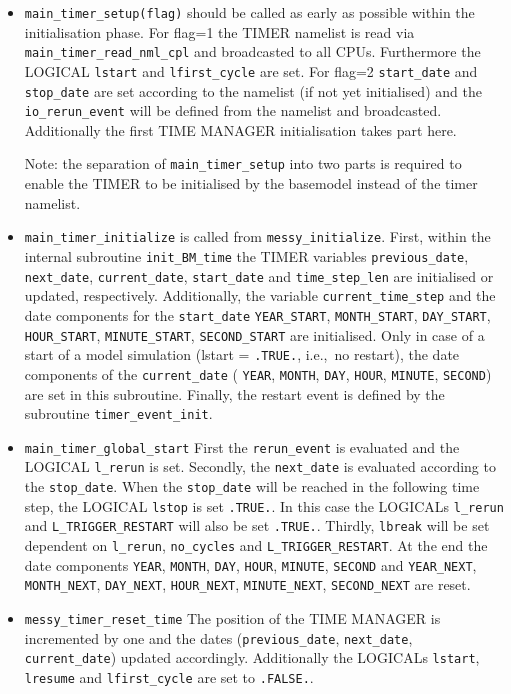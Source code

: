 \documentclass[twoside]{article}
\begin{document}
\begin{itemize}
\item \verb|main_timer_setup(flag)| should be called as early as possible within 
 the initialisation phase. For flag=1 the TIMER namelist is
 read via \verb|main_timer_read_nml_cpl| and broadcasted to all CPUs. 
 Furthermore the {\footnotesize LOGICAL} \verb|lstart| and \verb|lfirst_cycle| are set.
 For flag=2  \verb|start_date| and \verb|stop_date| are set according to the
 namelist (if not yet initialised) and the \verb|io_rerun_event| will be
 defined from the namelist and broadcasted. Additionally the first TIME MANAGER
 initialisation takes part here.
 
 Note: the separation of \verb|main_timer_setup| into two
 parts is required to enable the TIMER to be initialised by the basemodel
 instead of the timer namelist.  
\item \verb|main_timer_initialize| is called from \verb|messy_initialize|. First,
 within the internal subroutine  \verb|init_BM_time| the TIMER variables 
\verb|previous_date|, \verb|next_date|, \verb|current_date|, \verb|start_date|
 and \verb|time_step_len| are initialised or updated, respectively.
Additionally, the variable \verb|current_time_step| and the date components
for the  \verb|start_date| \verb|YEAR_START|, \verb|MONTH_START|,
\verb|DAY_START|, \verb|HOUR_START|, \verb|MINUTE_START|, \verb|SECOND_START| are
initialised. Only in case of a start of a model simulation
 (lstart = \verb|.TRUE.|, i.e.,~no restart), the date components of the
  \verb|current_date| ( \verb|YEAR|, \verb|MONTH|, \verb|DAY|, \verb|HOUR|, 
\verb|MINUTE|, \verb|SECOND|) are set in this subroutine.
  Finally, the restart event is defined by the subroutine 
  \verb|timer_event_init|.

\item \verb|main_timer_global_start|
  First the \verb|rerun_event| is evaluated and the {\footnotesize LOGICAL} \verb|l_rerun| is
  set. Secondly, the \verb|next_date| is evaluated according to the
  \verb|stop_date|. When the \verb|stop_date| will be reached in the following
  time step, the {\footnotesize LOGICAL}  \verb|lstop| is set \verb|.TRUE.|. In this case
  the {\footnotesize LOGICAL}s  \verb|l_rerun| and  \verb|L_TRIGGER_RESTART| will also be set
  \verb|.TRUE.|. Thirdly, \verb|lbreak| will be set dependent on \verb|l_rerun|,
  \verb|no_cycles| and  \verb|L_TRIGGER_RESTART|. At the end the date components
  \verb|YEAR|, \verb|MONTH|, \verb|DAY|, \verb|HOUR|, 
  \verb|MINUTE|, \verb|SECOND| and \verb|YEAR_NEXT|, \verb|MONTH_NEXT|,
  \verb|DAY_NEXT|, \verb|HOUR_NEXT|, \verb|MINUTE_NEXT|, \verb|SECOND_NEXT|
  are reset.
\item \verb|messy_timer_reset_time|
  The position of the TIME MANAGER is incremented by one and the dates 
  (\verb|previous_date|, \verb|next_date|, \verb|current_date|) 
  updated accordingly. Additionally the {\footnotesize LOGICAL}s  \verb|lstart|,
     \verb|lresume| and \verb|lfirst_cycle| are set to \verb|.FALSE.|.
\end{itemize}
\end{document}
